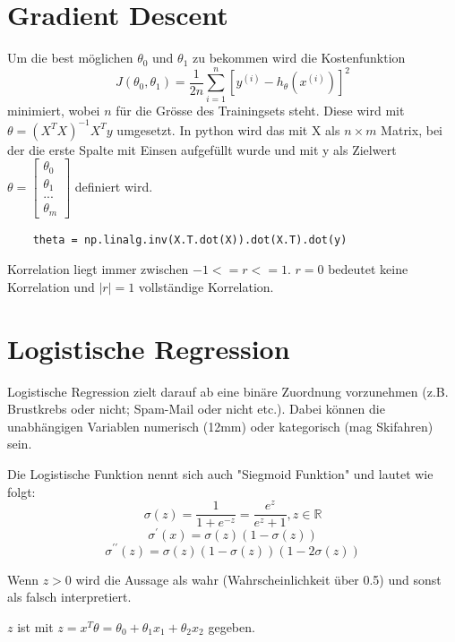 \documentclass{article}
\begin{document}
\section{Gradient Descent}
	Um die best möglichen $\theta_0$ und $\theta_1$ zu bekommen wird die Kostenfunktion
	\[ J(\theta_0,\theta_1)=\frac{1}{2 n} \sum_{i=1}^{n} [y^{(i)}-h_\theta(x^{(i)})]^2 \] minimiert, wobei $n$ für die Grösse des Trainingsets steht.
	Diese wird mit $\theta = (X^T X)^{-1} X^T y$ umgesetzt. 
	In python wird das mit X als $n \times m$ Matrix, bei der die erste Spalte mit Einsen aufgefüllt wurde und mit y als Zielwert
	$\theta = 
	\begin{bmatrix}
	\theta_0 \\[0.1pt] \theta_1 \\[0.1pt] ... \\[0.1pt] \theta_m
	\end{bmatrix}$ definiert wird.
	
	\begin{lstlisting}
	theta = np.linalg.inv(X.T.dot(X)).dot(X.T).dot(y)
	\end{lstlisting}
	
	Korrelation liegt immer zwischen $-1 <= r <= 1$.
	$r = 0$ bedeutet keine Korrelation und $|r| = 1$ vollständige Korrelation.
\section{Logistische Regression}
	Logistische Regression zielt darauf ab eine binäre Zuordnung vorzunehmen (z.B. Brustkrebs oder nicht; Spam-Mail oder nicht etc.).
	Dabei können die unabhängigen Variablen numerisch (12mm) oder kategorisch (mag Skifahren) sein.
	
	Die Logistische Funktion nennt sich auch "Siegmoid Funktion" und lautet wie folgt:
	$$\sigma(z) = \frac{1}{1+e^{-z}} = \frac{e^z}{e^z+1}, z \in \mathbb{R}$$
	$$\sigma^{\prime}(x) = \sigma(z) (1-\sigma(z))$$
	$$\sigma^{\prime\prime}(z)= \sigma(z)(1-\sigma(z))(1-2\sigma(z))$$
	
	Wenn $z > 0$ wird die Aussage als wahr (Wahrscheinlichkeit über 0.5) und sonst als falsch interpretiert.
	
	$z$ ist mit $z=x^T \theta = \theta_0 + \theta_1 x_1 + \theta_2 x_2$ gegeben.
\end{document}
